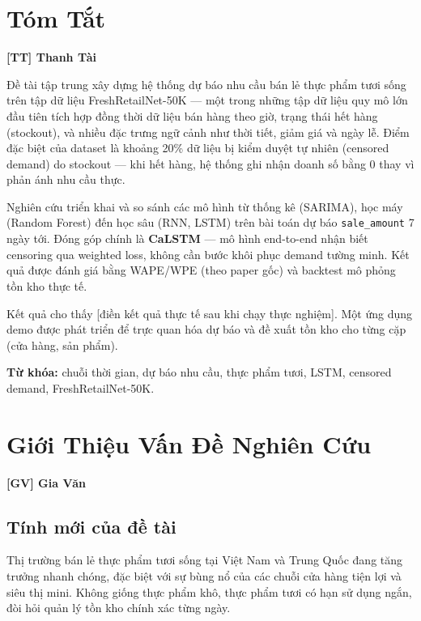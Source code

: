 \documentclass[12pt,a4paper]{report}
\newcommand{\ownerGV}{\colorbox{green!20}{\textbf{[GV] Gia Văn}}}
\newcommand{\ownerTT}{\colorbox{red!15}{\textbf{[TT] Thanh Tài}}}
\begin{document}
\tableofcontents
\newpage
\listoffigures
\listoftables
\newpage

\chapter*{Tóm Tắt}
\ownerTT
\thispagestyle{fancy}

Đề tài tập trung xây dựng hệ thống dự báo nhu cầu bán lẻ thực phẩm tươi sống trên tập dữ liệu FreshRetailNet-50K --- một trong những tập dữ liệu quy mô lớn đầu tiên tích hợp đồng thời dữ liệu bán hàng theo giờ, trạng thái hết hàng (stockout), và nhiều đặc trưng ngữ cảnh như thời tiết, giảm giá và ngày lễ. Điểm đặc biệt của dataset là khoảng 20\% dữ liệu bị kiểm duyệt tự nhiên (censored demand) do stockout --- khi hết hàng, hệ thống ghi nhận doanh số bằng 0 thay vì phản ánh nhu cầu thực.

Nghiên cứu triển khai và so sánh các mô hình từ thống kê (SARIMA), học máy (Random Forest) đến học sâu (RNN, LSTM) trên bài toán dự báo \texttt{sale\_amount} 7 ngày tới. Đóng góp chính là \textbf{CaLSTM} --- mô hình end-to-end nhận biết censoring qua weighted loss, không cần bước khôi phục demand tường minh. Kết quả được đánh giá bằng WAPE/WPE (theo paper gốc) và backtest mô phỏng tồn kho thực tế.

Kết quả cho thấy [điền kết quả thực tế sau khi chạy thực nghiệm]. Một ứng dụng demo được phát triển để trực quan hóa dự báo và đề xuất tồn kho cho từng cặp (cửa hàng, sản phẩm).

\textbf{Từ khóa:} chuỗi thời gian, dự báo nhu cầu, thực phẩm tươi, LSTM, censored demand, FreshRetailNet-50K.

\newpage

\chapter{Giới Thiệu Vấn Đề Nghiên Cứu}
\ownerGV

\section{Tính mới của đề tài}

Thị trường bán lẻ thực phẩm tươi sống tại Việt Nam và Trung Quốc đang tăng trưởng nhanh chóng, đặc biệt với sự bùng nổ của các chuỗi cửa hàng tiện lợi và siêu thị mini. Không giống thực phẩm khô, thực phẩm tươi có hạn sử dụng ngắn, đòi hỏi quản lý tồn kho chính xác từng ngày.
\end{document}
